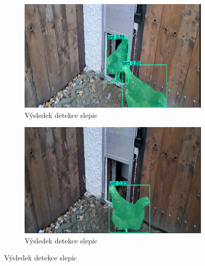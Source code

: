 \begin{figure}[h]
    \begin{subfigure}[t]{1\textwidth}
        \centering
        \includegraphics[width=\textwidth]{img/chicken_detection3}
        \caption{Výsledek detekce slepic}
        \label{fig:chicken_detection3}
    \end{subfigure}

    \begin{subfigure}[t]{1\textwidth}
        \centering
        \includegraphics[width=\textwidth]{img/chicken_detection4}
        \caption{Výsledek detekce slepic}
        \label{fig:chicken_detection4}
    \end{subfigure}
\end{figure}

